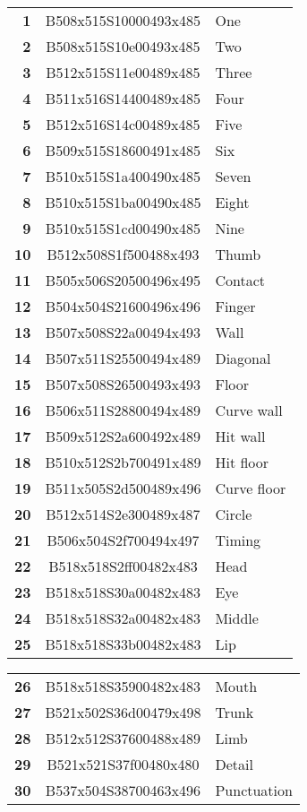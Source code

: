 \documentclass{article}
\begin{document}
\begin{multicols}{3}
\noindent
\begin{tabular}{r@{}c@{}l}
\textbf{1}&B508x515S10000493x485&One\\
\textbf{2}&B508x515S10e00493x485&Two\\
\textbf{3}&B512x515S11e00489x485&Three\\
\textbf{4}&B511x516S14400489x485&Four\\
\textbf{5}&B512x516S14c00489x485&Five\\
\textbf{6}&B509x515S18600491x485&Six\\
\textbf{7}&B510x515S1a400490x485&Seven\\
\textbf{8}&B510x515S1ba00490x485&Eight\\
\textbf{9}&B510x515S1cd00490x485&Nine\\
\textbf{10}&B512x508S1f500488x493&Thumb\\
\textbf{11}&B505x506S20500496x495&Contact\\
\textbf{12}&B504x504S21600496x496&Finger\\
\textbf{13}&B507x508S22a00494x493&Wall\\
\textbf{14}&B507x511S25500494x489&Diagonal\\
\textbf{15}&B507x508S26500493x493&Floor\\
\textbf{16}&B506x511S28800494x489&Curve wall\\
\textbf{17}&B509x512S2a600492x489&Hit wall\\
\textbf{18}&B510x512S2b700491x489&Hit floor\\
\textbf{19}&B511x505S2d500489x496&Curve floor\\
\textbf{20}&B512x514S2e300489x487&Circle\\
\textbf{21}&B506x504S2f700494x497&Timing\\
\textbf{22}&B518x518S2ff00482x483&Head\\
\textbf{23}&B518x518S30a00482x483&Eye\\
\textbf{24}&B518x518S32a00482x483&Middle\\
\textbf{25}&B518x518S33b00482x483&Lip\\
\end{tabular}

\noindent
\begin{tabular}{r@{}c@{}l}
\textbf{26}&B518x518S35900482x483&Mouth\\
\textbf{27}&B521x502S36d00479x498&Trunk\\
\textbf{28}&B512x512S37600488x489&Limb\\
\textbf{29}&B521x521S37f00480x480&Detail\\
\textbf{30}&B537x504S38700463x496&Punctuation\\
\end{tabular}


\end{multicols}
\end{document}

